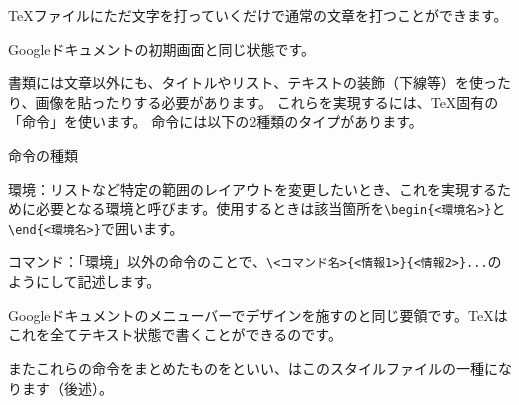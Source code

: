 \begin{multicols*}{2}
\TeX ファイルにただ文字を打っていくだけで通常の文章を打つことができます。

Googleドキュメントの初期画面と同じ状態です。

書類には文章以外にも、タイトルやリスト、テキストの装飾（下線等）を使ったり、画像を貼ったりする必要があります。
これらを実現するには、\TeX 固有の「命令」を使います。
命令には以下の2種類のタイプがあります。
\begin{framebox-simple}{命令の種類}
\begin{reitemize}
    \item 環境：リストなど特定の範囲のレイアウトを変更したいとき、これを実現するために必要となる環境と呼びます。使用するときは該当箇所を\verb|\begin{<環境名>}|と\verb|\end{<環境名>}|で囲います。
    \item コマンド：「環境」以外の命令のことで、\verb|\<コマンド名>{<情報1>}{<情報2>}...|のようにして記述します。
\end{reitemize}
\end{framebox-simple}
Googleドキュメントのメニューバーでデザインを施すのと同じ要領です。\TeX はこれを全てテキスト状態で書くことができるのです。

またこれらの命令をまとめたものをといい、\BunTeX はこのスタイルファイルの一種になります（後述）。


\end{multicols*}
